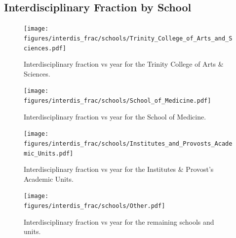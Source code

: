\documentclass[notitlepage,aps,prd,nofootinbib]{revtex4-1}
\newcommand{\figures}{../outputs/plots}
\begin{document}
\begin{appendices}
\section{Interdisciplinary Fraction by School}
\label{appendix:interdis_frac_school}

\begin{figure}[!htb]\centering
  \texttt{[image: \\figures/interdis\_frac/schools/Trinity\_College\_of\_Arts\_and\_Sciences.pdf]}
  \caption{Interdisciplinary fraction vs year for the Trinity College of Arts \& Sciences.}
\end{figure}

\begin{figure}[!htb]\centering
  \texttt{[image: \\figures/interdis\_frac/schools/School\_of\_Medicine.pdf]}
  \caption{Interdisciplinary fraction vs year for the School of Medicine.}
\end{figure}

\begin{figure}[!htb]\centering
  \texttt{[image: \\figures/interdis\_frac/schools/Institutes\_and\_Provosts\_Academic\_Units.pdf]}
  \caption{Interdisciplinary fraction vs year for the Institutes \& Provost's Academic Units.}
\end{figure}

\begin{figure}[!htb]\centering
  \texttt{[image: \\figures/interdis\_frac/schools/Other.pdf]}
  \caption{Interdisciplinary fraction vs year for the remaining schools and units.}
\end{figure}

\end{appendices}
\end{document}
